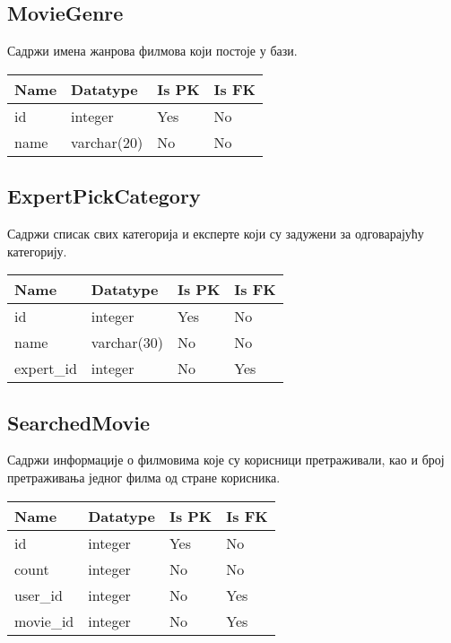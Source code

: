 \subsection{MovieGenre}

Садржи имена жанрова филмова који постоје у бази.

\vspace{0.5cm}

\noindent
\setcellgapes{4pt}
\makegapedcells
\begin{tabularx}{\linewidth}{|X|X|X|X|}
    \hline
    \textbf{Name} & \textbf{Datatype} & \textbf{Is PK} & \textbf{Is FK} \\
    \hline
    id & integer & Yes & No \\
    \hline
    name & varchar(20) & No & No \\
    \hline
\end{tabularx}

\subsection{ExpertPickCategory}

Садржи списак свих категорија и експерте који су задужени за одговарајућу категорију. 

\vspace{0.5cm}

\noindent
\setcellgapes{4pt}
\makegapedcells
\begin{tabularx}{\linewidth}{|X|X|X|X|}
    \hline
    \textbf{Name} & \textbf{Datatype} & \textbf{Is PK} & \textbf{Is FK} \\
    \hline
    id & integer & Yes & No \\
    \hline
    name & varchar(30) & No & No \\
    \hline
    expert\_id & integer & No & Yes \\
    \hline
\end{tabularx}

\subsection{SearchedMovie}

Садржи информације о филмовима које су корисници претраживали, као и број претраживања једног филма од стране корисника.

\vspace{0.5cm}

\noindent
\setcellgapes{4pt}
\makegapedcells
\begin{tabularx}{\linewidth}{|X|X|X|X|}
    \hline
    \textbf{Name} & \textbf{Datatype} & \textbf{Is PK} & \textbf{Is FK} \\
    \hline
    id & integer & Yes & No \\
    \hline
    count & integer & No & No \\
    \hline
    user\_id & integer & No & Yes \\
    \hline
    movie\_id & integer & No & Yes \\
    \hline
\end{tabularx}

